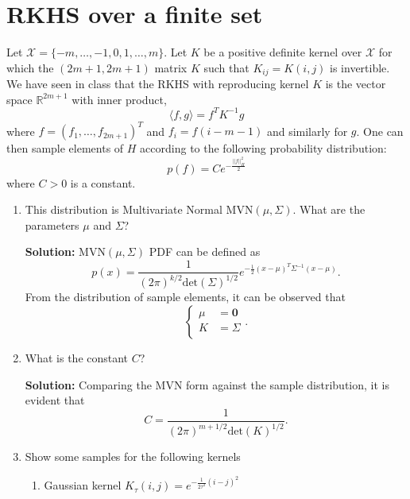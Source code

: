 \documentclass{article}[12pt]
\begin{document}
\section{RKHS over a finite set}
Let $\mathcal{X} = \{-m,\ldots,-1,0,1,\ldots,m\}$. Let $K$ be a positive definite kernel over $\mathcal{X}$ for which the $(2m+1,2m+1)$ matrix $K$ such that $K_{ij}=K(i,j)$ is invertible. We have seen in class that the RKHS with reproducing kernel $K$ is the vector space $\mathbb{R}^{2m+1}$ with inner product, 
$$\langle f,g \rangle = f^T K^{-1}g $$
where $f=(f_1,\ldots,f_{2m+1})^T$ and $f_i=f(i-m-1)$ and similarly for $g$. 
One can then sample elements of $H$ according to the following probability distribution:  
$$p(f) = C e^{-\frac{||f||_H^2}{2}}$$
where $C>0$ is a constant. 
\begin{enumerate}
\item This distribution is Multivariate Normal MVN$(\mu,\Sigma)$. What are the parameters $\mu$ and $\Sigma$?

	\textbf{Solution:} MVN$(\mu, \Sigma)$ PDF can be defined as 
	\begin{equation}
		p(x) = \frac{1}{(2\pi)^{k/2} \text{det}(\Sigma)^{1/2}} e^{- \frac{1}{2} (x-\mu)^T \Sigma^{-1} (x-\mu) }. 
	\end{equation}
	From the distribution of sample elements, it can be observed that 
	\begin{equation}
		\begin{cases}
			\mu &= \mathbf 0 \\	
			K &= \Sigma \\
		\end{cases}.
	\end{equation}

\item What is the constant $C$?

	\textbf{Solution:} Comparing the MVN form against the sample distribution, it is evident that \begin{equation}
		C = \frac{1}{(2\pi)^{m+1/2} \text{det} (K)^{1/2}}. 
	\end{equation}
	
\item Show some samples for the following kernels
\begin{enumerate}
\item Gaussian kernel $K_\tau(i,j)=e^{-\frac{1}{2\tau^2}(i-j)^2}$


\end{enumerate}
\end{enumerate}
\end{document}
